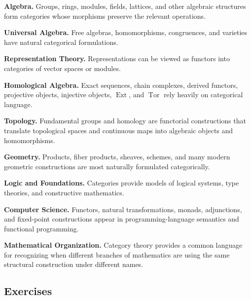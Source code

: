 \begin{applicationbox}
\textbf{Algebra.}
Groups, rings, modules, fields, lattices, and other algebraic structures
form categories whose morphisms preserve the relevant operations.

\medskip

\textbf{Universal Algebra.}
Free algebras, homomorphisms, congruences, and varieties have natural
categorical formulations.

\medskip

\textbf{Representation Theory.}
Representations can be viewed as functors into categories of vector spaces
or modules.

\medskip

\textbf{Homological Algebra.}
Exact sequences, chain complexes, derived functors, projective objects,
injective objects, \(\operatorname{Ext}\), and \(\operatorname{Tor}\) rely
heavily on categorical language.

\medskip

\textbf{Topology.}
Fundamental groups and homology are functorial constructions that translate
topological spaces and continuous maps into algebraic objects and
homomorphisms.

\medskip

\textbf{Geometry.}
Products, fiber products, sheaves, schemes, and many modern geometric
constructions are most naturally formulated categorically.

\medskip

\textbf{Logic and Foundations.}
Categories provide models of logical systems, type theories, and
constructive mathematics.

\medskip

\textbf{Computer Science.}
Functors, natural transformations, monads, adjunctions, and fixed-point
constructions appear in programming-language semantics and functional
programming.

\medskip

\textbf{Mathematical Organization.}
Category theory provides a common language for recognizing when different
branches of mathematics are using the same structural construction under
different names.
\end{applicationbox}

\subsection{Exercises}
\label{subsec:category-exercises}

